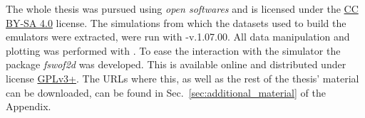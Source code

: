 The whole thesis was pursued using \emph{open softwares} and is licensed under the \href{https://creativecommons.org/licenses/by-sa/4.0/}{CC BY-SA 4.0} license.
The simulations from which the datasets used to build the emulators were extracted, were run with -v.1.07.00.
All data manipulation and plotting was performed with .
To ease the interaction with the simulator the  package \emph{fswof2d} was developed.
This is available online and distributed under license \href{https://www.gnu.org/licenses/quick-guide-gplv3.html}{GPLv3+}.
The URLs where this, as well as the rest of the thesis' material can be downloaded, can be found in Sec.~\ref{sec:additional_material} of the Appendix.




















